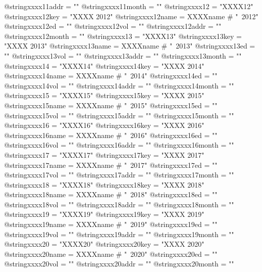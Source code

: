 @string{xxxx11addr =            ""}
@string{xxxx11month =           ""}
@string{xxxx12 =                "XXXX12"}
@string{xxxx12key =             "XXXX 2012"}
@string{xxxx12name =            XXXXname # "~2012"}
@string{xxxx12ed =              ""}
@string{xxxx12vol =             ""}
@string{xxxx12addr =            ""}
@string{xxxx12month =           ""}
@string{xxxx13 =                "XXXX13"}
@string{xxxx13key =             "XXXX 2013"}
@string{xxxx13name =            XXXXname # "~2013"}
@string{xxxx13ed =              ""}
@string{xxxx13vol =             ""}
@string{xxxx13addr =            ""}
@string{xxxx13month =           ""}
@string{xxxx14 =                "XXXX14"}
@string{xxxx14key =             "XXXX 2014"}
@string{xxxx14name =            XXXXname # "~2014"}
@string{xxxx14ed =              ""}
@string{xxxx14vol =             ""}
@string{xxxx14addr =            ""}
@string{xxxx14month =           ""}
@string{xxxx15 =                "XXXX15"}
@string{xxxx15key =             "XXXX 2015"}
@string{xxxx15name =            XXXXname # "~2015"}
@string{xxxx15ed =              ""}
@string{xxxx15vol =             ""}
@string{xxxx15addr =            ""}
@string{xxxx15month =           ""}
@string{xxxx16 =                "XXXX16"}
@string{xxxx16key =             "XXXX 2016"}
@string{xxxx16name =            XXXXname # "~2016"}
@string{xxxx16ed =              ""}
@string{xxxx16vol =             ""}
@string{xxxx16addr =            ""}
@string{xxxx16month =           ""}
@string{xxxx17 =                "XXXX17"}
@string{xxxx17key =             "XXXX 2017"}
@string{xxxx17name =            XXXXname # "~2017"}
@string{xxxx17ed =              ""}
@string{xxxx17vol =             ""}
@string{xxxx17addr =            ""}
@string{xxxx17month =           ""}
@string{xxxx18 =                "XXXX18"}
@string{xxxx18key =             "XXXX 2018"}
@string{xxxx18name =            XXXXname # "~2018"}
@string{xxxx18ed =              ""}
@string{xxxx18vol =             ""}
@string{xxxx18addr =            ""}
@string{xxxx18month =           ""}
@string{xxxx19 =                "XXXX19"}
@string{xxxx19key =             "XXXX 2019"}
@string{xxxx19name =            XXXXname # "~2019"}
@string{xxxx19ed =              ""}
@string{xxxx19vol =             ""}
@string{xxxx19addr =            ""}
@string{xxxx19month =           ""}
@string{xxxx20 =                "XXXX20"}
@string{xxxx20key =             "XXXX 2020"}
@string{xxxx20name =            XXXXname # "~2020"}
@string{xxxx20ed =              ""}
@string{xxxx20vol =             ""}
@string{xxxx20addr =            ""}
@string{xxxx20month =           ""}


